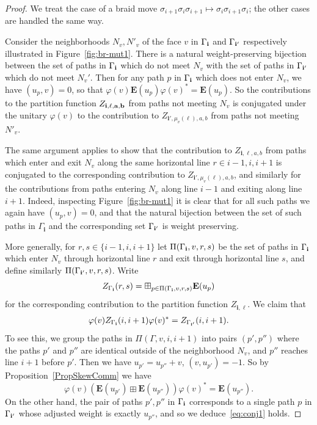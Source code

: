 \documentclass[11pt, reqno]{amsart}
\theoremstyle{definition}
\numberwithin{equation}{section}
\newcommand{\Eb}{\mathbf{E}}
\newcommand{\mbi}{\mathbf{i}}
\begin{document}
\begin{proof}
We treat the case of a braid move $ \sigma_{i+1}\sigma_{i}\sigma_{i+1}\mapsto \sigma_{i}\sigma_{i+1}\sigma_{i}$; the other cases are handled the same way. 

Consider the neighborhoods $N_v,N'_v$ of the face $v$ in $\Gamma_{\bf i}$ and $\Gamma_{\bf i'}$ respectively illustrated in Figure~\ref{fig:br-mut1}.
There is a natural weight-preserving bijection between the set of paths in $\Gamma_{\bf i}$ which do not meet $N_v$ with the set of paths in $\Gamma_{\bf i'}$ which do not meet $N_v'$. Then for any path $p$ in $\Gamma_{\bf i}$ which does not enter $N_v$, we have $(u_p,v)=0$, so that $\varphi(v)\Eb({u}_p)\varphi(v)^*=\Eb({u}_p)$. So the contributions to the partition function $Z_{\bf i,\ell,a,b}$ from paths not meeting $N_v$ is conjugated under the unitary $\varphi(v)$ to the contribution to $Z_{\mathbf{i}',\mu_v(\ell),a,b}$ from paths not meeting $N'_v$. 

The same argument applies to show that the contribution to $Z_{\mathbf{i},\ell,a,b}$ from paths which enter and exit $N_v$ along the same horizontal line $r\in {i-1,i,i+1}$ is conjugated to the corresponding contribution to $Z_{\mathbf{i}',\mu_v(\ell),a,b}$, and similarly for the contributions from paths entering $N_v$ along line $i-1$ and exiting along line $i+1$. Indeed, inspecting Figure~\ref{fig:br-mut1} it is clear that for all such paths we again have $(u_p,v)=0$, and that the natural bijection between the set of such paths in $\Gamma_{\mbi}$ and the corresponding set $\Gamma_{\bf i'}$ is weight preserving. 

More generally, for $r,s\in \{i-1,i,i+1\}$ let $\Pi(\Gamma_{\bf i},v,r,s)$ be the set of paths in $\Gamma_{\bf i}$ which enter $N_v$ through horizontal line $r $ and exit through horizontal line $s$, and define similarly $\Pi(\Gamma_{\bf i'},v,r,s)$. Write
$$
Z_{\Gamma_{\bf i}}(r,s)  = \boxplus_{p\in \Pi(\Gamma_{\bf i},v,r,s)}\Eb(u_p)
$$
for the corresponding contribution to the partition function $Z_{\mathbf{i},\ell}$. We claim that
\begin{align}
\label{eq:conj1}
\varphi(v)Z_{\Gamma_{\bf i}}(i,i+1) \varphi(v)^* = Z_{\Gamma_{\bf i'}}(i,i+1).
\end{align}
To see this, we group the paths in $\Pi(\Gamma,v,i,i+1)$ into pairs $(p',p'')$ where the paths $p'$ and $p''$ are identical outside of the neighborhood $N_v$, and $p''$ reaches line $i+1$ before $p'$. Then we have $u_{p'}=u_{p''}+v$, $(v,u_{p'})=-1$. 
So by Proposition~\ref{PropSkewComm} we have
$$
\varphi(v)(\Eb({u}_{p'})\boxplus \Eb({u}_{p''}))\varphi(v)^* = \Eb({u}_{p''}).
$$
On the other hand, the pair of paths $p',p''$ in $\Gamma_{\bf i}$ corresponds to a single path $p$ in $\Gamma_{\bf i'}$ whose adjusted weight is exactly ${u}_{p''}$, and so we deduce~\eqref{eq:conj1} holds. 


\end{proof}
\end{document}

